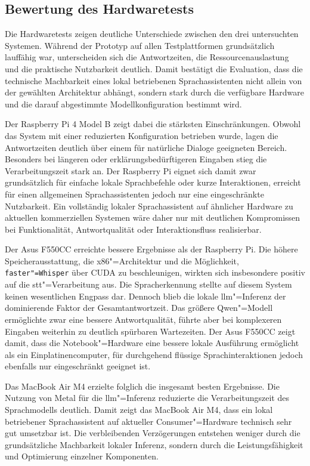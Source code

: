\subsection{Bewertung des Hardwaretests}
\label{subsec:Bewertung_des_Hardwaretest}
Die Hardwaretests zeigen deutliche Unterschiede zwischen den drei untersuchten Systemen. Während der Prototyp auf allen Testplattformen grundsätzlich lauffähig war, unterscheiden sich die Antwortzeiten, die Ressourcenauslastung und die praktische Nutzbarkeit deutlich. Damit bestätigt die Evaluation, dass die technische Machbarkeit eines lokal betriebenen Sprachassistenten nicht allein von der gewählten Architektur abhängt, sondern stark durch die verfügbare Hardware und die darauf abgestimmte Modellkonfiguration bestimmt wird.

Der Raspberry Pi 4 Model B zeigt dabei die stärksten Einschränkungen. Obwohl das System mit einer reduzierten Konfiguration betrieben wurde, lagen die Antwortzeiten deutlich über einem für natürliche Dialoge geeigneten Bereich. Besonders bei längeren oder erklärungsbedürftigeren Eingaben stieg die Verarbeitungszeit stark an. Der Raspberry Pi eignet sich damit zwar grundsätzlich für einfache lokale Sprachbefehle oder kurze Interaktionen, erreicht für einen allgemeinen Sprachassistenten jedoch nur eine eingeschränkte Nutzbarkeit. Ein vollständig lokaler Sprachassistent auf ähnlicher Hardware zu aktuellen kommerziellen Systemen wäre daher nur mit deutlichen Kompromissen bei Funktionalität, Antwortqualität oder Interaktionsfluss realisierbar.

Der Asus F550CC erreichte bessere Ergebnisse als der Raspberry Pi. Die höhere Speicherausstattung, die x86"=Architektur und die Möglichkeit, \texttt{faster"=Whisper} über CUDA zu beschleunigen, wirkten sich insbesondere positiv auf die \gls{stt}"=Verarbeitung aus. Die Spracherkennung stellte auf diesem System keinen wesentlichen Engpass dar. Dennoch blieb die lokale \gls{llm}"=Inferenz der dominierende Faktor der Gesamtantwortzeit. Das größere Qwen"=Modell ermöglichte zwar eine bessere Antwortqualität, führte aber bei komplexeren Eingaben weiterhin zu deutlich spürbaren Wartezeiten. Der Asus F550CC zeigt damit, dass die Notebook"=Hardware eine bessere lokale Ausführung ermöglicht als ein Einplatinencomputer, für durchgehend flüssige Sprachinteraktionen jedoch ebenfalls nur eingeschränkt geeignet ist.

Das MacBook Air M4 erzielte folglich die insgesamt besten Ergebnisse. Die Nutzung von Metal für die \gls{llm}"=Inferenz reduzierte die Verarbeitungszeit des Sprachmodells deutlich. Damit zeigt das MacBook Air M4, dass ein lokal betriebener Sprachassistent auf aktueller Consumer"=Hardware technisch sehr gut umsetzbar ist. Die verbleibenden Verzögerungen entstehen weniger durch die grundsätzliche Machbarkeit lokaler Inferenz, sondern durch die Leistungsfähigkeit und Optimierung einzelner Komponenten.

